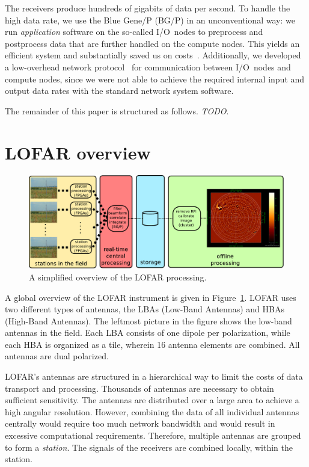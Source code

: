 \documentclass{sig-alternate}
\begin{document}
The receivers produce hundreds of gigabits of data per second.
To handle the high data rate,
we use the Blue Gene/P (BG/P) in an unconventional way: we run
\emph{application\/} software on the so-called I/O~nodes to preprocess and
postprocess data that are further handled on the compute nodes.
This yields an efficient system and substantially saved us on
costs~\cite{Iskra:08}.
Additionally, we developed a low-overhead network protocol~\cite{Romein:09a}
for communication between I/O~nodes and compute nodes, since we were not able
to achieve the required internal input and output data rates with the standard
network system software.

The remainder of this paper is structured as follows.
\emph{TODO}.


\section{LOFAR overview}

\begin{figure}
\includegraphics[width=\columnwidth]{lofar-overview.pdf}
\caption{A simplified overview of the LOFAR processing.}
\label{fig:lofar-overview}
\end{figure}

A global overview of the LOFAR instrument is given in
Figure~\ref{fig:lofar-overview}. LOFAR uses two different types of
antennas, the LBAs (Low-Band Antennas) and HBAs (High-Band Antennas).
The leftmost picture in the figure shows the low-band
antennas in the field.  Each LBA consists of one dipole per polarization,
while each HBA is organized as a tile, wherein 16 antenna elements are
combined. All antennas are dual polarized.

LOFAR's antennas are structured in a hierarchical way to limit the
costs of data transport and processing. Thousands of antennas are
necessary to obtain sufficient sensitivity. The antennas are
distributed over a large area to achieve a high angular resolution.
However, combining the data of all individual antennas centrally would
require too much network bandwidth and would result in excessive
computational requirements. Therefore, multiple antennas are grouped
to form a \emph{station}.
The signals of the receivers are combined locally, within the station.
\end{document}
